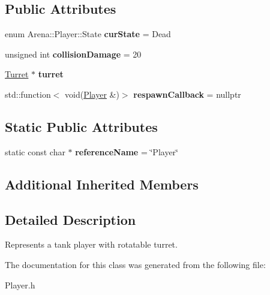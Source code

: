 \subsection*{Public Attributes}
\begin{DoxyCompactItemize}
\item 
\hypertarget{class_arena_1_1_player_ae8b0acc9c546a21e20c705e40a64ee29}{enum Arena\+::\+Player\+::\+State {\bfseries cur\+State} = Dead}\label{class_arena_1_1_player_ae8b0acc9c546a21e20c705e40a64ee29}

\item 
\hypertarget{class_arena_1_1_player_a8e9ca1b2e58fd3ab80e410b5dee3ba37}{unsigned int {\bfseries collision\+Damage} = 20}\label{class_arena_1_1_player_a8e9ca1b2e58fd3ab80e410b5dee3ba37}

\item 
\hypertarget{class_arena_1_1_player_a0adc096e775af7e9b69d8ba21cc279b9}{\hyperlink{class_arena_1_1_turret}{Turret} $\ast$ {\bfseries turret}}\label{class_arena_1_1_player_a0adc096e775af7e9b69d8ba21cc279b9}

\item 
\hypertarget{class_arena_1_1_player_a35d3903e1a32c8fb3591787b91a14080}{std\+::function$<$ void(\hyperlink{class_arena_1_1_player}{Player} \&)$>$ {\bfseries respawn\+Callback} = nullptr}\label{class_arena_1_1_player_a35d3903e1a32c8fb3591787b91a14080}

\end{DoxyCompactItemize}
\subsection*{Static Public Attributes}
\begin{DoxyCompactItemize}
\item 
\hypertarget{class_arena_1_1_player_a10fbc13ca917fd12d711f8fb363b4da9}{static const char $\ast$ {\bfseries reference\+Name} = \char`\"{}Player\char`\"{}}\label{class_arena_1_1_player_a10fbc13ca917fd12d711f8fb363b4da9}

\end{DoxyCompactItemize}
\subsection*{Additional Inherited Members}


\subsection{Detailed Description}
Represents a tank player with rotatable turret. 

The documentation for this class was generated from the following file\+:\begin{DoxyCompactItemize}
\item 
Player.\+h\end{DoxyCompactItemize}
